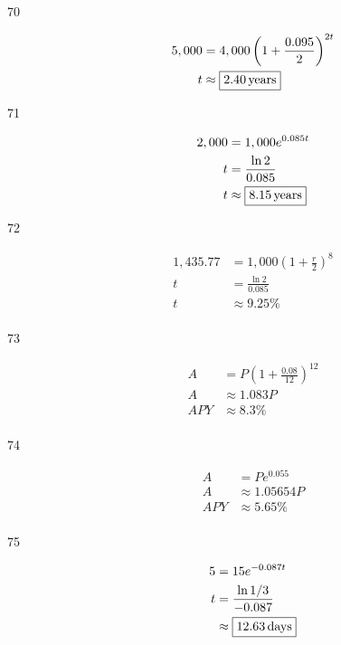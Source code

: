 \documentclass{exam}
\begin{document}
\begin{description}
      \item[70]
        \begin{align*}
          5,000 & = 4,000 \left( 1 + \frac{0.095}{2} \right)^{2t} \\
          t     & \approx \boxed{\unit[2.40]{years}} \\
        \end{align*}

      \item[71]
        \begin{align*}
          2,000 & = 1,000 e^{0.085t} \\
          t     & = \frac{\ln 2}{0.085} \\
          t     & \approx \boxed{\unit[8.15]{years}} \\
        \end{align*}

      \item[72]
        \begin{align*}
          1,435.77 &= 1,000 \left( 1 + \frac{r}{2} \right)^8 \\
          t &= \frac{\ln 2}{0.085} \\
          t     & \approx \boxed{9.25\%} \\
        \end{align*}

      \item[73]
        \begin{align*}
          A   & = P \left( 1 + \frac{0.08}{12} \right)^{12} \\
          A   & \approx 1.083 P \\
          APY & \approx \boxed{8.3\%} \\
        \end{align*}

      \item[74]
        \begin{align*}
          A   & = P e^{0.055} \\
          A   & \approx 1.05654 P \\
          APY & \approx \boxed{5.65\%} \\
        \end{align*}

      \item[75]
        \begin{align*}
          5 &= 15 e^{-0.087t} \\
          t &= \frac{\ln 1/3}{-0.087} \\
            &\approx \boxed{\unit[12.63]{days}} \\
        \end{align*}


\end{description}
\end{document}

